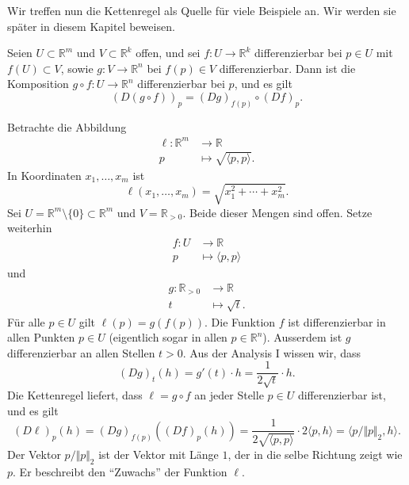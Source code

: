 \documentclass[../main.tex]{subfiles}
\begin{document}
Wir treffen nun die Kettenregel als Quelle
für viele Beispiele an.
Wir werden sie später in diesem Kapitel beweisen.

\begin{theorem*}[Kettenregel]
  Seien $U \subset \mathbb{R}^m$ und $V \subset \mathbb{R}^k$ 
  offen, und sei $f \colon U \to \mathbb{R}^k$ differenzierbar
  bei $p \in U$ mit $f(U) \subset V$,
  sowie $g \colon V \to \mathbb{R}^n$ bei $f(p) \in V$ 
  differenzierbar.
  Dann ist die Komposition $g \circ f \colon U \to \mathbb{R}^n$ 
  differenzierbar bei $p$, und es gilt
  \[
    {(D(g \circ f))}_p = {(Dg)}_{f(p)} \circ {(Df)}_p.
  \]
\end{theorem*}

\begin{example}
  Betrachte die Abbildung
  \begin{align*}
    \ell \colon \mathbb{R}^m & \to \mathbb{R} \\
    p & \mapsto \sqrt{\langle p, p \rangle}.
  \end{align*}
  In Koordinaten $x_1, \dots, x_m$ ist
   \[
     \ell(x_1, \dots, x_m) = \sqrt{x_1^2 + \cdots + x_m^2}.
  \]
  Sei $U = \mathbb{R}^m \setminus \{0\} \subset \mathbb{R}^m$ 
  und $V = \mathbb{R}_{>0}$.
  Beide dieser Mengen sind offen. Setze weiterhin
  \begin{align*}
    f \colon U & \to \mathbb{R} \\
    p & \mapsto \langle p, p \rangle
  \end{align*}
  und
  \begin{align*}
    g \colon \mathbb{R}_{>0} & \to \mathbb{R} \\
    t & \mapsto \sqrt t.
  \end{align*}
  Für alle $p \in U$ gilt $\ell(p) = g(f(p))$.
  Die Funktion $f$ ist differenzierbar in allen
  Punkten $p \in U$ 
  (eigentlich sogar in allen $p \in \mathbb{R}^n$).
  Ausserdem ist $g$ differenzierbar an allen Stellen
  $t > 0$.
  Aus der Analysis I wissen wir, dass
  \[
    {(Dg)}_t(h) = g'(t) \cdot h = \frac{1}{2 \sqrt t} \cdot h.
  \]
  Die Kettenregel liefert, dass
  $\ell = g \circ f$ an jeder Stelle $p \in U$ differenzierbar ist,
  und es gilt
  \[
    {(D \ell)}_p(h) = {(Dg)}_{f(p)}({(Df)}_p(h))
    = \frac{1}{2 \sqrt{\langle p, p \rangle}} \cdot 2 \langle p, h \rangle
    = \langle p / \Vert p \Vert_2, h \rangle.
  \]
  Der Vektor $p / \Vert p \Vert_2$ ist der Vektor mit Länge $1$,
  der in die selbe Richtung zeigt wie $p$.
  Er beschreibt den ``Zuwachs'' der Funktion $\ell$.
\end{example}
\end{document}
